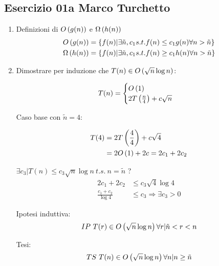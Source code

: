 
\subsection[01a MT]{Esercizio 01a Marco Turchetto}

\begin{enumerate}[label=\alph*)]
\item
	Definizioni di \( O\left(g(n)\right) \) e \( \Omega\left(h(n)\right) \) \\
	\begin{align*}
		O\left(g(n)\right) &= \{ f(n) | \exists \tilde{n}, c_1 s.t. f(n) \leq c_1 g(n) \forall n > \tilde{n} \} \\
		\Omega\left(h(n)\right) &= \{ f(n) | \exists \tilde{n}, c_1 s.t. f(n) \geq c_1 h(n) \forall n > \tilde{n} \} \\
	\end{align*}

\item 
	Dimostrare per induzione che \( T(n) \in O\left(\sqrt{n} \log n\right) \):

	\begin{equation*}
		T(n)=
		\begin{cases}
			O\left(1\right) \\
			2T \left(\frac{n}{4} \right) + c \sqrt{n} \\
		\end{cases}
	\end{equation*}
	
	Caso base con $\tilde{n} = 4$:
	
	\begin{align*}
		T(4) &= 2T \left(\frac{4}{4} \right) + c \sqrt{4} \\
			 &= 2 O\left(1\right) + 2c = 2c_1 + 2c_2 \\
	\end{align*}
	
	\( \exists c_3 | T(n) \leq c_3 \sqrt{n} \log n \ t.s. \ n = \tilde{n} \) ? \\
	
	\begin{align*}
		2c_1 + 2c_2 &\leq c_3 \sqrt{4} \log 4 \\
		\frac{c_1 + c_2}{\log 4} &\leq c_3 \Rightarrow \exists c_3 > 0
	\end{align*}
	
	Ipotesi induttiva:\\
	\[
		IP \ T(r) \in O\left(\sqrt{n} \log n\right) \forall r | \tilde{n} < r < n
	\]
	
	Tesi:\\
	\[
		TS \ T(n) \in O\left(\sqrt{n} \log n\right) \forall n | n \geq \tilde{n}
	\]
	

\end{enumerate}
